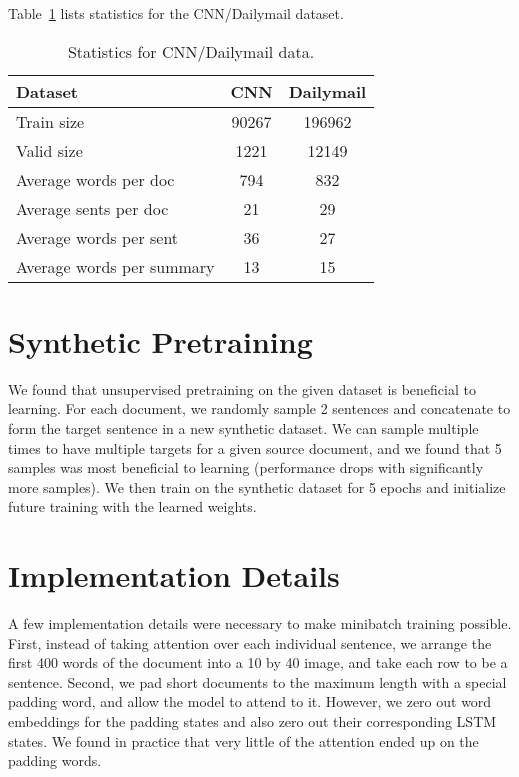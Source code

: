 \documentclass[11pt]{report}
\begin{document}
 Table~\ref{data_stats} lists statistics for the CNN/Dailymail dataset.

\begin{table}[h]
\centering
\begin{tabular}{lcc}
\toprule
Dataset  & CNN & Dailymail \\
\midrule
Train size & 90267 & 196962 \\
Valid size & 1221 & 12149 \\
Average words per doc & 794 & 832\\
Average sents per doc & 21 & 29\\
Average words per sent & 36 & 27\\
Average words per summary & 13 & 15 \\
\bottomrule
\end{tabular}
\caption{Statistics for CNN/Dailymail data.}
\label{data_stats}
\end{table}




\section{Synthetic Pretraining} %

We found that unsupervised pretraining on the given dataset is beneficial to learning. For each document, we randomly sample 2 sentences and concatenate to form the target sentence in a new synthetic dataset. We can sample multiple times to have multiple targets for a given source document, and we found that 5 samples was most beneficial to learning (performance drops with significantly more samples). We then train on the synthetic dataset for 5 epochs and initialize future training with the learned weights.

\section{Implementation Details}

A few implementation details were necessary to make minibatch training possible. First, instead of taking attention over each individual sentence, we arrange the first 400 words of the document into a 10 by 40 image, and take each row to be a sentence. Second, we pad short documents to the maximum length with a special padding word, and allow the model to attend to it. However, we zero out word embeddings for the padding states and also zero out their corresponding LSTM states. We found in practice that very little of the attention ended up on the padding words.
\end{document}
